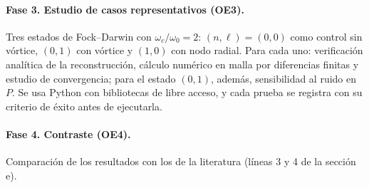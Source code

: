 \documentclass[12pt,letterpaper]{article}
\begin{document}
\paragraph{Fase 3. Estudio de casos representativos (OE3).} Tres estados de Fock--Darwin con $\omega_c/\omega_0=2$:
$(n,\ell)=(0,0)$ como control sin vórtice, $(0,1)$ con vórtice y $(1,0)$ con nodo radial. Para cada uno: verificación
analítica de la reconstrucción, cálculo numérico en malla por diferencias finitas y estudio de convergencia; para el
estado $(0,1)$, además, sensibilidad al ruido en $P$. Se usa Python con bibliotecas de libre acceso, y cada prueba se
registra con su criterio de éxito antes de ejecutarla.

\paragraph{Fase 4. Contraste (OE4).} Comparación de los resultados con los de la literatura (líneas 3 y 4 de la sección
e).
\end{document}
